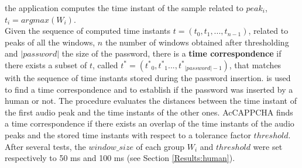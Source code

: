 the application computes the time instant of the sample related to $peak_i$, $t_i= argmax(W_i)$.\\
Given the sequence of computed time instants $t=(t_0, t_1, ..., t_{n-1})$, related to peaks of all the windows, $n$ the number of windows obtained after thresholding and $|password|$ the size of the password, there is a \textbf{time correspondence} if there exists a subset of $t$, called $t^{*}=({t^*}_0, {t^*}_1..., {t^*}_{|password|-1})$, that matches with the sequence of time instants stored during the password insertion.  is used to find a time correspondence and to establish if the password was inserted by a human or not. The procedure evaluates the distances between the time instant of the first audio peak and the time instants of the other ones. AcCAPPCHA finds a time correspondence if there exists an overlap of the time instants of the audio peaks and the stored time instants with respect to a tolerance factor $threshold$. After several tests, the $window\_size$ of each group $W_i$ and $threshold$ were set respectively to 50 ms and 100 ms (see Section \ref{Results:human}).\\ 
